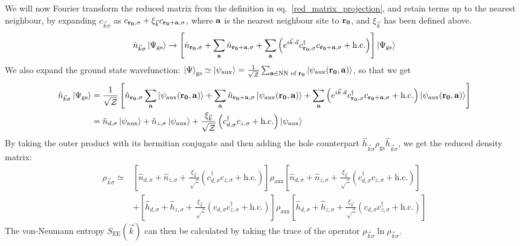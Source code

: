 \documentclass[reprint,hidelinks]{revtex4-2}
\begin{document}
We will now Fourier transform the reduced matrix from the definition in eq.~\ref{red_matrix_projection}, and retain terms up to the nearest neighbour, by expanding \(c_{\vec k\sigma}\) as \(c_{{\bf r_0},\sigma} + \xi_{\vec k}c_{{\bf r_0} + {\bf a},\sigma}\), where \({\bf a}\) is the nearest neighbour site to \({\bf r_0}\), and \(\xi_{\vec k}\) has been defined above.
\begin{equation}\begin{aligned}
	\hat n_{\vec k\sigma}\ket{\Psi_\text{gs}} \to  \left[ \hat n_{{\bf r_0},\sigma} + \sum_{{\bf a}} \hat n_{{\bf r_0} + {\bf a},\sigma} + \sum_{{\bf a}}\left( e^{i \vec{k}\cdot\vec{a}}c^\dagger_{{\bf r_0},\sigma}c_{{\bf r_0} + {\bf a},\sigma} + \text{h.c.} \right) \right]\ket{\Psi_\text{gs}}
\end{aligned}\end{equation}
We also expand the ground state wavefunction: \(\ket{\Psi}_\text{gs} \simeq \ket{\psi_\text{aux}} = \frac{1}{\sqrt \mathcal{Z}}\sum_{{\bf a} \in \text{NN of }{\bf r_0}}\ket{\psi_\text{aux}({\bf r_0},{\bf a})}\), so that we get
\begin{equation}\begin{aligned}
	\hat n_{\vec k\sigma}\ket{\Psi_\text{gs}} &= \frac{1}{\sqrt \mathcal{Z}}\left[ \hat n_{{\bf r_0},\sigma} \sum_{{\bf a}}\ket{\psi_\text{aux}({\bf r_0},{\bf a})} + \sum_{{\bf a}} \hat n_{{\bf r_0} + {\bf a},\sigma}\ket{\psi_\text{aux}({\bf r_0},{\bf a})} + \sum_{{\bf a}}\left( e^{i \vec{k}\cdot\vec{a}}c^\dagger_{{\bf r_0},\sigma}c_{{\bf r_0} + {\bf a},\sigma} + \text{h.c.} \right) \ket{\psi_\text{aux}({\bf r_0},{\bf a})}\right]\\
						  &=\hat n_{d,\sigma} \ket{\psi_\text{aux}} + \hat n_{z,\sigma}\ket{\psi_\text{aux}} + \frac{\xi_{\vec k}}{\sqrt \mathcal{Z}}\left(c^\dagger_{d,\sigma}c_{z,\sigma} + \text{h.c.} \right) \ket{\psi_\text{aux}}
\end{aligned}\end{equation}
By taking the outer product with its hermitian conjugate and then adding the hole counterpart \(\hat h_{\vec k\sigma}\rho_\text{gs} \hat h_{\vec k\sigma}\), we get the reduced density matrix:
\begin{equation}\begin{aligned}
	\rho_{\vec k\sigma} \simeq& \left[\hat n_{d,\sigma} + \hat n_{z,\sigma} + \frac{\xi_{\vec k}}{\sqrt \mathcal{Z}}\left(c^\dagger_{d,\sigma}c_{z,\sigma} + \text{h.c.} \right)\right] \rho_\text{aux} \left[\hat n_{d,\sigma} + \hat n_{z,\sigma} + \frac{\xi_{\vec k}}{\sqrt \mathcal{Z}}\left(c^\dagger_{d,\sigma}c_{z,\sigma} + \text{h.c.} \right)\right]\\
				  &+ \left[\hat h_{d,\sigma} + \hat h_{z,\sigma} + \frac{\xi_{\vec k}}{\sqrt \mathcal{Z}}\left(c_{d,\sigma}c^\dagger_{z,\sigma} + \text{h.c.} \right)\right] \rho_\text{aux} \left[\hat h_{d,\sigma} + \hat h_{z,\sigma} + \frac{\xi_{\vec k}}{\sqrt \mathcal{Z}}\left(c_{d,\sigma}c^\dagger_{z,\sigma} + \text{h.c.} \right)\right]\label{density_matrix_kspace}
\end{aligned}\end{equation}
The von-Neumann entropy \(S_\text{EE}(\vec k)\) can then be calculated by taking the trace of the operator \(\rho_{\vec k\sigma}\ln \rho_{\vec k\sigma}\).
\end{document}
